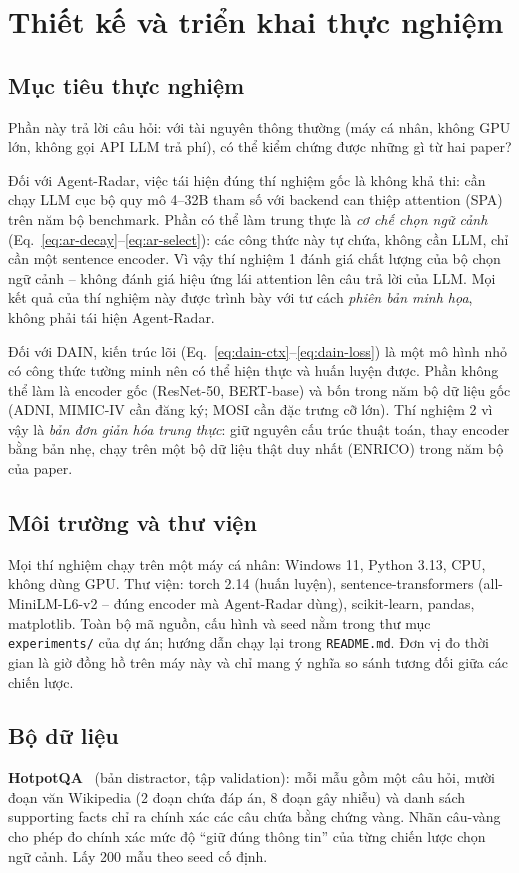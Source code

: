 \section{Thiết kế và triển khai thực nghiệm}\label{sec:experiments}

\subsection{Mục tiêu thực nghiệm}
Phần này trả lời câu hỏi: với tài nguyên thông thường (máy cá nhân, không GPU lớn, không gọi API LLM trả phí), có thể kiểm chứng được những gì từ hai paper?

Đối với Agent-Radar, việc tái hiện đúng thí nghiệm gốc là không khả thi: cần chạy LLM cục bộ quy mô 4--32B tham số với backend can thiệp attention (SPA) trên năm bộ benchmark. Phần có thể làm trung thực là \emph{cơ chế chọn ngữ cảnh} (Eq.~\ref{eq:ar-decay}--\ref{eq:ar-select}): các công thức này tự chứa, không cần LLM, chỉ cần một sentence encoder. Vì vậy thí nghiệm 1 đánh giá chất lượng của bộ chọn ngữ cảnh -- không đánh giá hiệu ứng lái attention lên câu trả lời của LLM. Mọi kết quả của thí nghiệm này được trình bày với tư cách \emph{phiên bản minh họa}, không phải tái hiện Agent-Radar.

Đối với DAIN, kiến trúc lõi (Eq.~\ref{eq:dain-ctx}--\ref{eq:dain-loss}) là một mô hình nhỏ có công thức tường minh nên có thể hiện thực và huấn luyện được. Phần không thể làm là encoder gốc (ResNet-50, BERT-base) và bốn trong năm bộ dữ liệu gốc (ADNI, MIMIC-IV cần đăng ký; MOSI cần đặc trưng cỡ lớn). Thí nghiệm 2 vì vậy là \emph{bản đơn giản hóa trung thực}: giữ nguyên cấu trúc thuật toán, thay encoder bằng bản nhẹ, chạy trên một bộ dữ liệu thật duy nhất (ENRICO) trong năm bộ của paper.

\subsection{Môi trường và thư viện}
Mọi thí nghiệm chạy trên một máy cá nhân: Windows 11, Python 3.13, CPU, không dùng GPU. Thư viện: torch 2.14 (huấn luyện), sentence-transformers (all-MiniLM-L6-v2 -- đúng encoder mà Agent-Radar dùng), scikit-learn, pandas, matplotlib. Toàn bộ mã nguồn, cấu hình và seed nằm trong thư mục \texttt{experiments/} của dự án; hướng dẫn chạy lại trong \texttt{README.md}. Đơn vị đo thời gian là giờ đồng hồ trên máy này và chỉ mang ý nghĩa so sánh tương đối giữa các chiến lược.

\subsection{Bộ dữ liệu}
\textbf{HotpotQA}~\cite{yang2018hotpotqa} (bản distractor, tập validation): mỗi mẫu gồm một câu hỏi, mười đoạn văn Wikipedia (2 đoạn chứa đáp án, 8 đoạn gây nhiễu) và danh sách supporting facts chỉ ra chính xác các câu chứa bằng chứng vàng. Nhãn câu-vàng cho phép đo chính xác mức độ ``giữ đúng thông tin'' của từng chiến lược chọn ngữ cảnh. Lấy 200 mẫu theo seed cố định.

